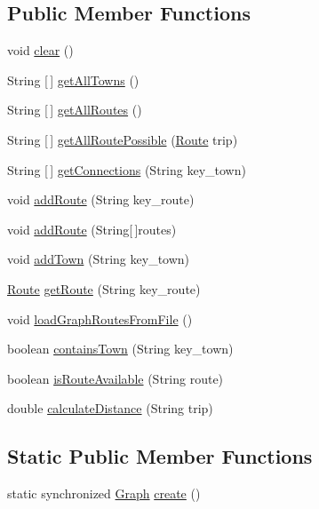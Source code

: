 \subsection*{Public Member Functions}
\begin{DoxyCompactItemize}
\item 
void \hyperlink{classdomain_1_1_graph_ab310780b6719b7b94e8eea0a0603f6c1}{clear} ()
\item 
String \mbox{[}$\,$\mbox{]} \hyperlink{classdomain_1_1_graph_a3789a71ab36974dce8c6c6aac41007f3}{get\+All\+Towns} ()
\item 
String \mbox{[}$\,$\mbox{]} \hyperlink{classdomain_1_1_graph_aa91cc429a4ea1d2c3341baea617e4028}{get\+All\+Routes} ()
\item 
String \mbox{[}$\,$\mbox{]} \hyperlink{classdomain_1_1_graph_a3ceedf597c66f500579a0e302c32062b}{get\+All\+Route\+Possible} (\hyperlink{classdomain_1_1_route}{Route} trip)
\item 
String \mbox{[}$\,$\mbox{]} \hyperlink{classdomain_1_1_graph_adab0f0e6ae7af913998f537aa0fe62f1}{get\+Connections} (String key\+\_\+town)
\item 
void \hyperlink{classdomain_1_1_graph_a2ecd9722f3cbb7d97fda519101d249ed}{add\+Route} (String key\+\_\+route)
\item 
void \hyperlink{classdomain_1_1_graph_a356a31b6dba042cccb2a743caa07bfdf}{add\+Route} (String\mbox{[}$\,$\mbox{]}routes)
\item 
void \hyperlink{classdomain_1_1_graph_a93f040b758a5f920d195f2fbfdccc741}{add\+Town} (String key\+\_\+town)
\item 
\hyperlink{classdomain_1_1_route}{Route} \hyperlink{classdomain_1_1_graph_a3499aec1dfba7e73b34007cb4271e192}{get\+Route} (String key\+\_\+route)
\item 
void \hyperlink{classdomain_1_1_graph_ae98fbece4e39b0fb8979139f06b0a914}{load\+Graph\+Routes\+From\+File} ()
\item 
boolean \hyperlink{classdomain_1_1_graph_aa8ae0912dcbd41c932ab29815e85af36}{contains\+Town} (String key\+\_\+town)
\item 
boolean \hyperlink{classdomain_1_1_graph_ab5da77fcafda90e249b7c3c049ccc3ff}{is\+Route\+Available} (String route)
\item 
double \hyperlink{classdomain_1_1_graph_a7b7f2784b1c0ab3ab14ce6c271659913}{calculate\+Distance} (String trip)
\end{DoxyCompactItemize}
\subsection*{Static Public Member Functions}
\begin{DoxyCompactItemize}
\item 
static synchronized \hyperlink{classdomain_1_1_graph}{Graph} \hyperlink{classdomain_1_1_graph_a57ce4efd344c059a565f4bb104fdee64}{create} ()
\end{DoxyCompactItemize}
